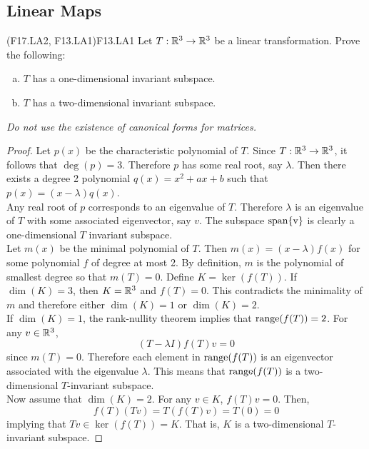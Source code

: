 \documentclass[../AlgebraQualSolutions.tex]{subfiles}
\begin{document}
\subsection{Linear Maps}

	\begin{prob}{(F17.LA2, F13.LA1)}{F13.LA1}
		Let $T: \mathbb{R}^3 \to \mathbb{R}^3$ be a linear transformation. Prove the following:
		\begin{enumerate}[(a)]
			\item $T$ has a one-dimensional invariant subspace.
			\item $T$ has a two-dimensional invariant subspace.
		\end{enumerate}
	
		\emph{ Do not use the existence of canonical forms for matrices.}
	\end{prob}

	\begin{proof}
		Let $p(x)$ be the characteristic polynomial of $T$. Since $T: \mathbb{R}^3 \to \mathbb{R}^3$, it follows that $\deg(p) = 3$. Therefore $p$ has some real root, say $\lambda$. Then there exists a degree 2 polynomial $q(x) = x^2 + ax + b$ such that $p(x) = (x-\lambda)q(x)$.\\

		Any real root of $p$ corresponds to an eigenvalue of $T$. Therefore $\lambda$ is an eigenvalue of $T$ with some associated eigenvector, say $v$. The subspace $\rm{span}\{v\}$ is clearly a one-dimensional $T$ invariant subspace.\\

		Let $m(x)$ be the minimal polynomial of $T$. Then $m(x) = (x-\lambda)f(x)$ for some polynomial $f$ of degree at most 2. By definition, $m$ is the polynomial of smallest degree so that $m(T) = 0$. Define $K = \ker(f(T))$. If $\dim(K) = 3$, then $K = \mathbb{R}^3$ and $f(T) = 0$. This contradicts the minimality of $m$ and therefore either $\dim(K) = 1$ or $\dim(K) = 2$.\\

		If $\dim(K) = 1$, the rank-nullity theorem implies that $\mathrm{range}(f(T)) = 2$. For any $v \in \mathbb{R}^3$,
			\[(T - \lambda I)f(T)v = 0\]
		since $m(T) = 0$. Therefore each element in $\mathrm{range}(f(T))$ is an eigenvector associated with the eigenvalue $\lambda$. This means that $\mathrm{range}(f(T))$ is a two-dimensional $T$-invariant subspace.\\

		Now assume that $\dim(K) = 2$. For any $v \in K$, $f(T)v = 0$. Then,
			\[f(T)(Tv) = T(f(T)v) = T(0) = 0\]
		implying that $Tv \in \ker(f(T)) = K$. That is, $K$ is a two-dimensional $T$-invariant subspace.
	\end{proof}
\end{document}
